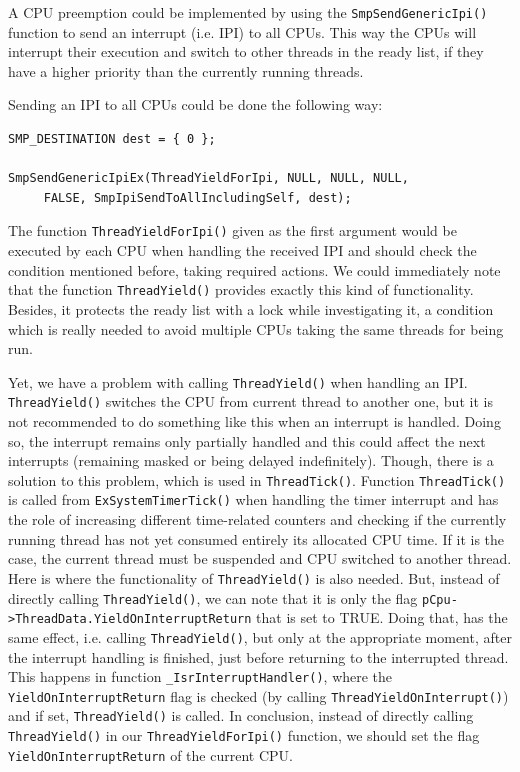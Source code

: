 A CPU preemption could be implemented by using the \lstinline|SmpSendGenericIpi()| function to send an interrupt (i.e. IPI) to all CPUs. This way the CPUs will interrupt their execution and switch to other threads in the ready list, if they have a higher priority than the currently running threads. 

Sending an IPI to all CPUs could be done the following way:
\begin{lstlisting}
SMP_DESTINATION dest = { 0 };

SmpSendGenericIpiEx(ThreadYieldForIpi, NULL, NULL, NULL, 
     FALSE, SmpIpiSendToAllIncludingSelf, dest);    
\end{lstlisting}


The function \lstinline|ThreadYieldForIpi()| given as the first argument would be executed by each CPU when handling the received IPI and should check the condition mentioned before, taking required actions. We could immediately note that the function \lstinline|ThreadYield()| provides exactly this kind of functionality. Besides, it protects the ready list with a lock while investigating it, a condition which is really needed to avoid multiple CPUs taking the same threads for being run. 

Yet, we have a problem with calling \lstinline|ThreadYield()| when handling an IPI. \lstinline|ThreadYield()| switches the CPU from current thread to another one, but it is not recommended to do something like this when an interrupt is handled. Doing so, the interrupt remains only partially handled and this could affect the next interrupts (remaining masked or being delayed indefinitely). Though, there is a solution to this problem, which is used in \lstinline|ThreadTick()|. Function \lstinline|ThreadTick()| is called from \lstinline|ExSystemTimerTick()| when handling the timer interrupt and has the role of increasing different time-related counters and checking if the currently running thread has not yet consumed entirely its allocated CPU time. If it is the case, the current thread must be suspended and CPU switched to another thread. Here is where the functionality of \lstinline|ThreadYield()| is also needed. But, instead of directly calling \lstinline|ThreadYield()|, we can note that it is only the flag \lstinline|pCpu->ThreadData.YieldOnInterruptReturn| that is set to TRUE. Doing that, has the same effect, i.e. calling \lstinline|ThreadYield()|, but only at the appropriate moment, after the interrupt handling is finished, just before returning to the interrupted thread. This happens in function \lstinline|_IsrInterruptHandler()|, where the \lstinline|YieldOnInterruptReturn| flag is checked (by calling \lstinline|ThreadYieldOnInterrupt()|) and if set, \lstinline|ThreadYield()| is called. In conclusion, instead of directly calling \lstinline|ThreadYield()| in our \lstinline|ThreadYieldForIpi()| function, we should set the flag \lstinline|YieldOnInterruptReturn| of the current CPU.

